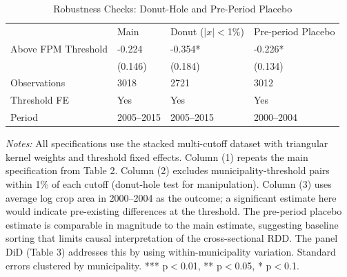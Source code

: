 \begin{table}[htbp]
\small
\centering
\caption{Robustness Checks: Donut-Hole and Pre-Period Placebo}
\label{tab:tab5_robustness}
\begin{tabular}{llll}
& Main & Donut ($|x|<$1\%) & Pre-period Placebo \\
Above FPM Threshold & -0.224 & -0.354* & -0.226* \\
& (0.146) & (0.184) & (0.134) \\
Observations & 3018 & 2721 & 3012 \\
Threshold FE & Yes & Yes & Yes \\
Period & 2005--2015 & 2005--2015 & 2000--2004 \\
\end{tabular}
\begin{minipage}{0.95\textwidth}
\vspace{4pt}\scriptsize
\textit{Notes:} All specifications use the stacked multi-cutoff dataset with triangular kernel weights and threshold fixed effects. Column (1) repeats the main specification from Table 2. Column (2) excludes municipality-threshold pairs within 1\% of each cutoff (donut-hole test for manipulation). Column (3) uses average log crop area in 2000--2004 as the outcome; a significant estimate here would indicate pre-existing differences at the threshold. The pre-period placebo estimate is comparable in magnitude to the main estimate, suggesting baseline sorting that limits causal interpretation of the cross-sectional RDD. The panel DiD (Table 3) addresses this by using within-municipality variation. Standard errors clustered by municipality. *** p$<$0.01, ** p$<$0.05, * p$<$0.1.
\end{minipage}
\end{table}

